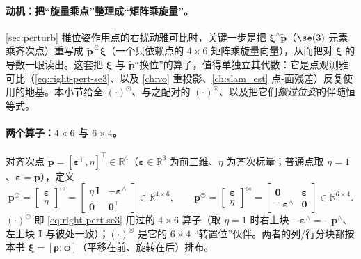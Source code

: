 \paragraph{动机：把“旋量乘点”整理成“矩阵乘旋量”。}
\cref{sec:perturb} 推位姿作用点的右扰动雅可比时，关键一步是把 $\boldsymbol{\xi}^\wedge\tilde{\mathbf{p}}$（$\se(3)$ 元素乘齐次点）重写成 $\tilde{\mathbf{p}}^{\,\odot}\boldsymbol{\xi}$（一个只依赖点的 $4\times6$ 矩阵乘旋量向量），从而把对 $\boldsymbol{\xi}$ 的导数一眼读出。这套把 $\boldsymbol{\xi}$ 与 $\tilde{\mathbf{p}}$“换位”的算子，值得单独立其代数：它是点观测雅可比（\cref{eq:right-pert-se3}、以及 \cref{ch:vo} 重投影、\cref{ch:slam_est} 点-面残差）反复使用的地基\cite{barfoot2024state}。本小节给全 $(\cdot)^\odot$、与之配对的 $(\cdot)^\circledcirc$、以及把它们\emph{搬过位姿}的伴随恒等式。

\paragraph{两个算子：$4\times6$ 与 $6\times4$。}对齐次点 $\mathbf{p}=[\boldsymbol{\varepsilon}^\top,\eta]^\top\in\mathbb{R}^4$（$\boldsymbol{\varepsilon}\in\mathbb{R}^3$ 为前三维、$\eta$ 为齐次标量；普通点取 $\eta=1$、$\boldsymbol{\varepsilon}=\mathbf{p}$），定义
\begin{equation}
  \mathbf{p}^{\odot}
  =\begin{bmatrix}\boldsymbol{\varepsilon}\\\eta\end{bmatrix}^{\!\odot}
  =\begin{bmatrix}\eta\,\mathbf{I}&-\boldsymbol{\varepsilon}^\wedge\\\mathbf{0}^\top&\mathbf{0}^\top\end{bmatrix}\in\mathbb{R}^{4\times6},
  \qquad
  \mathbf{p}^{\circledcirc}
  =\begin{bmatrix}\boldsymbol{\varepsilon}\\\eta\end{bmatrix}^{\!\circledcirc}
  =\begin{bmatrix}\mathbf{0}&\boldsymbol{\varepsilon}\\-\boldsymbol{\varepsilon}^\wedge&\mathbf{0}\end{bmatrix}\in\mathbb{R}^{6\times4}.
  \label{eq:odot-circ-def}
\end{equation}
$(\cdot)^\odot$ 即 \cref{eq:right-pert-se3} 用过的 $4\times6$ 算子（取 $\eta=1$ 时右上块 $-\boldsymbol{\varepsilon}^\wedge=-\mathbf{p}^\wedge$、左上块 $\mathbf{I}$ 与彼处一致）；$(\cdot)^\circledcirc$ 是它的 $6\times4$ “转置位”伙伴。两者的列/行分块都按本书 $\boldsymbol{\xi}=[\boldsymbol{\rho};\boldsymbol{\phi}]$（平移在前、旋转在后）排布。


